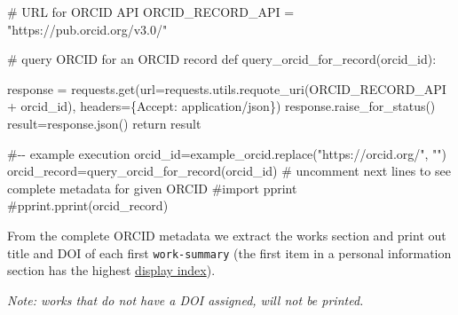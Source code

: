 \documentclass[
  letterpaper,
  DIV=11,
  numbers=noendperiod]{scrreprt}
\newenvironment{Shaded}{\begin{snugshade}}{\end{snugshade}}
\newcommand{\CommentTok}[1]{\textcolor[rgb]{0.37,0.37,0.37}{#1}}
\newcommand{\ControlFlowTok}[1]{\textcolor[rgb]{0.00,0.23,0.31}{#1}}
\newcommand{\KeywordTok}[1]{\textcolor[rgb]{0.00,0.23,0.31}{#1}}
\newcommand{\NormalTok}[1]{\textcolor[rgb]{0.00,0.23,0.31}{#1}}
\newcommand{\OperatorTok}[1]{\textcolor[rgb]{0.37,0.37,0.37}{#1}}
\newcommand{\StringTok}[1]{\textcolor[rgb]{0.13,0.47,0.30}{#1}}
\begin{document}
\begin{Shaded}
\begin{Highlighting}[]
\CommentTok{\# URL for ORCID API}
\NormalTok{ORCID\_RECORD\_API }\OperatorTok{=} \StringTok{"https://pub.orcid.org/v3.0/"}

\CommentTok{\# query ORCID for an ORCID record}
\KeywordTok{def}\NormalTok{ query\_orcid\_for\_record(orcid\_id):}

\NormalTok{    response }\OperatorTok{=}\NormalTok{ requests.get(url}\OperatorTok{=}\NormalTok{requests.utils.requote\_uri(ORCID\_RECORD\_API }\OperatorTok{+}\NormalTok{ orcid\_id),}
\NormalTok{                          headers}\OperatorTok{=}\NormalTok{\{}\StringTok{\textquotesingle{}Accept\textquotesingle{}}\NormalTok{: }\StringTok{\textquotesingle{}application/json\textquotesingle{}}\NormalTok{\})}
\NormalTok{    response.raise\_for\_status()}
\NormalTok{    result}\OperatorTok{=}\NormalTok{response.json()}
    \ControlFlowTok{return}\NormalTok{ result}


\CommentTok{\#{-}{-} example execution}
\NormalTok{orcid\_id}\OperatorTok{=}\NormalTok{example\_orcid.replace(}\StringTok{"https://orcid.org/"}\NormalTok{, }\StringTok{""}\NormalTok{)}
\NormalTok{orcid\_record}\OperatorTok{=}\NormalTok{query\_orcid\_for\_record(orcid\_id)}
\CommentTok{\# uncomment next lines to see complete metadata for given ORCID}
\CommentTok{\#import pprint}
\CommentTok{\#pprint.pprint(orcid\_record)}
\end{Highlighting}
\end{Shaded}

From the complete ORCID metadata we extract the works section and print
out title and DOI of each first \texttt{work-summary} (the first item in
a personal information section has the highest
\href{https://info.orcid.org/documentation/integration-guide/orcid-record/\#Display_index}{display
index}).

\emph{Note: works that do not have a DOI assigned, will not be printed.}
\end{document}
